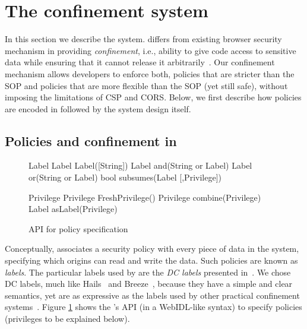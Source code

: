 

\section{The \sys{} confinement system}
\label{sec:system}

In this section we describe the \sys{} system.
%
\sys{} differs from existing browser security mechanism in providing
\emph{confinement}, i.e., ability to give code access to sensitive
data while ensuring that it cannot release it
arbitrarily~\cite{SaltzerS75}.
%
Our confinement mechanism allows developers to enforce both, policies
that are stricter than the SOP and policies that are more flexible
than the SOP (yet still safe), without imposing the limitations of CSP
and CORS.
%
Below, we first describe how policies are encoded in \sys{}
followed by the system design itself.

\subsection{Policies and confinement in \sys{}}
\label{sec:system:policy}

\begin{figure}
{\small{
\begin{webidl}
Label {
  Label Label([String])
  Label and(String or Label)
  Label or(String or Label)
  bool subsumes(Label [,Privilege])
}
\end{webidl}
\begin{webidl}
Privilege {
  Privilege FreshPrivilege()
  Privilege combine(Privilege)
  Label asLabel(Privilege)
}
\end{webidl}
}}
\vspace{-10pt}
\caption{\label{fig:APIspec} API for policy specification}
\vspace{-10pt}
\end{figure}


Conceptually, \sys{} associates a security policy with every piece of
data in the system, specifying which origins can read and write the
data.
%
Such policies are known as \emph{labels}.
%
The particular labels used by \sys{} are the \emph{DC
labels} presented in~\cite{stefan:2011:dclabels}.
%
We chose DC labels, much like Hails~\cite{giffin:2012:hails} and
Breeze~\cite{Breeze13}, because they have a simple and clear semantics, yet are
as expressive as the labels used by other practical confinement
systems~\cite{GenLabels}. Figure \ref{fig:APIspec} shows the \sys{}'s API (in a
WebIDL-like syntax) to specify policies (privileges to be
explained below).


